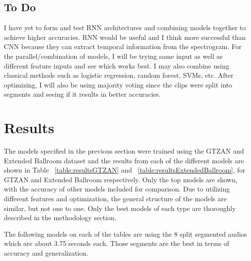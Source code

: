 \documentclass[10pt,twocolumn,letterpaper]{article}
\begin{document}
	\subsection{To Do}
	
	I have yet to form and test RNN architectures and combining models together to achieve higher accuracies. RNN would be useful and I think more successful than CNN because they can extract temporal information from the spectrogram. For the parallel/combination of models, I will be trying same input as well as different feature inputs and see which works best. I may also combine using classical methods such as logistic regression, random forest, SVMs, etc. After optimizing, I will also be using majority voting since the clips were split into segments and seeing if it results in better accuracies.
	
	\section{Results}
	
	The models specified in the previous section were trained using the GTZAN and Extended Ballroom dataset and the results from each of the different models are shown in Table ~\ref{table:resultsGTZAN} and ~\ref{table:resultsExtendedBallroom}, for GTZAN and Extended Ballroom respectively. Only the top models are shown, with the accuracy of other models included for comparison. Due to utilizing different features and optimization, the general structure of the models are similar, but not one to one. Only the best models of each type are thoroughly described in the methodology section.
	
	The following models on each of the tables are using the 8 split segmented audios which are about 3.75 seconds each. Those segments are the best in terms of accuracy and generalization.
	
\end{document}
